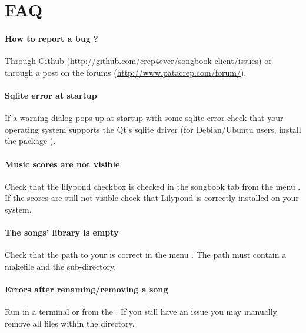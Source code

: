 \section{FAQ}

\paragraph{How to report a bug ?}
Through Github
(\url{http://github.com/crep4ever/songbook-client/issues}) or through
a post on the forums (\url{http://www.patacrep.com/forum/}).

\paragraph{Sqlite error at startup} 
If a warning dialog pops up at startup with some sqlite error
check that your operating system supports the Qt's sqlite driver (for
Debian/Ubuntu users, install the package ).

\paragraph{Music scores are not visible}
Check that the lilypond checkbox is checked in the songbook tab from
the menu . If the scores are still not visible
check that Lilypond is correctly installed on your system.

\paragraph{The songs' library is empty} 
Check that the path to your \recueil{} is correct in the menu
. The path must contain a makefile and the
 sub-directory.

\paragraph{Errors after renaming/removing a song} 
Run  in a terminal or  from
the \client{}. If you still have an issue you may manually remove all
 files within the  directory.
